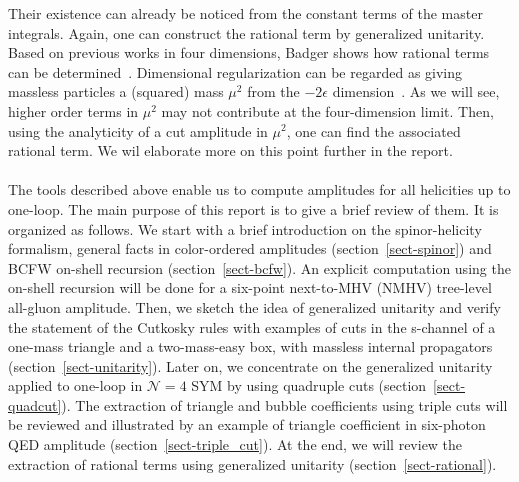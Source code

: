 %
Their existence can already be noticed from the constant terms of the master integrals.
Again, one can construct the rational term by generalized unitarity. 
Based on previous works in four dimensions, Badger shows how rational terms can be determined~\cite{Badger:2008cm}.
Dimensional regularization can be regarded as giving massless particles a (squared) mass $\mu^2$ from the $-2\epsilon$ dimension~\cite{Bern:1995db}.
As we will see, higher order terms in $\mu^2$ may not contribute at the four-dimension limit.
Then, using the analyticity of a cut amplitude in $\mu^2$, one can find the associated rational term.
We wil elaborate more on this point further in the report.
\\\\
The tools described above enable us to compute amplitudes for all helicities up to one-loop.
The main purpose of this report is to give a brief review of them.
It is organized as follows.
We start with a brief introduction on the spinor-helicity formalism, general facts in color-ordered amplitudes (section~\ref{sect-spinor}) and BCFW on-shell recursion (section~\ref{sect-bcfw}).
An explicit computation using the on-shell recursion will be done for a six-point next-to-MHV (NMHV) tree-level all-gluon amplitude. 
Then, we sketch the idea of generalized unitarity and verify the statement of the Cutkosky rules with examples of cuts in the s-channel of a one-mass triangle and a two-mass-easy box, with massless internal propagators (section~\ref{sect-unitarity}).
Later on, we concentrate on the generalized unitarity applied to one-loop in $\mathcal{N}=4$ SYM by using quadruple cuts (section~\ref{sect-quadcut}).
The extraction of triangle and bubble coefficients using triple cuts will be reviewed and illustrated by an example of triangle coefficient in six-photon QED amplitude (section~\ref{sect-triple_cut}).
At the end, we will review the extraction of rational terms using generalized unitarity (section~\ref{sect-rational}).
%
